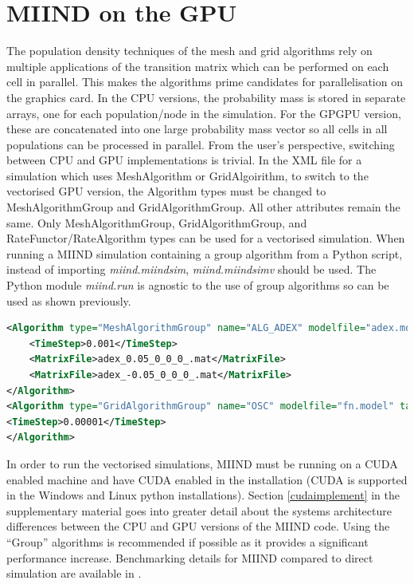 \documentclass[utf8]{frontiersSCNS} %
\begin{document}
\section{MIIND on the GPU}
The population density techniques of the mesh and grid algorithms rely on multiple applications of the transition matrix which can be performed on each cell in parallel. This makes the algorithms prime candidates for parallelisation on the graphics card. In the CPU versions, the probability mass is stored in separate arrays, one for each population/node in the simulation. For the GPGPU version, these are concatenated into one large probability mass vector so all cells in all populations can be processed in parallel. From the user’s perspective, switching between CPU and GPU implementations is trivial. In the XML file for a simulation which uses MeshAlgorithm or GridAlgoirithm, to switch to the vectorised GPU version, the Algorithm types must be changed to MeshAlgorithmGroup and GridAlgorithmGroup. All other attributes remain the same. Only MeshAlgorithmGroup, GridAlgorithmGroup, and RateFunctor/RateAlgorithm types can be used for a vectorised simulation. When running a MIIND simulation containing a group algorithm from a Python script, instead of importing \textit{miind.miindsim}, \textit{miind.miindsimv} should be used. The Python module \textit{miind.run} is agnostic to the use of group algorithms so can be used as shown previously.

\begin{lstlisting}[language=xml,caption={A MeshAlgorithmGroup definition is identical to a MeshAlgorithm definition except for the type.}]
<Algorithm type="MeshAlgorithmGroup" name="ALG_ADEX" modelfile="adex.model" >
	<TimeStep>0.001</TimeStep>
	<MatrixFile>adex_0.05_0_0_0_.mat</MatrixFile>
	<MatrixFile>adex_-0.05_0_0_0_.mat</MatrixFile>
</Algorithm>
<Algorithm type="GridAlgorithmGroup" name="OSC" modelfile="fn.model" tau_refractive="0.0" transformfile="fn_0_0_0_0_.tmat" start_v="-1.0" start_w="-0.3" ratemethod="AvgV">
<TimeStep>0.00001</TimeStep>
</Algorithm>
\end{lstlisting}

In order to run the vectorised simulations, MIIND must be running on a CUDA enabled machine and have CUDA enabled in the installation (CUDA is supported in the Windows and Linux python installations). Section \ref{cudaimplement} in the supplementary material goes into greater detail about the systems architecture differences between the CPU and GPU versions of the MIIND code. Using the ``Group'' algorithms is recommended if possible as it provides a significant performance increase. Benchmarking details for MIIND compared to direct simulation are available in \cite{de2019computational}.\\
\end{document}
